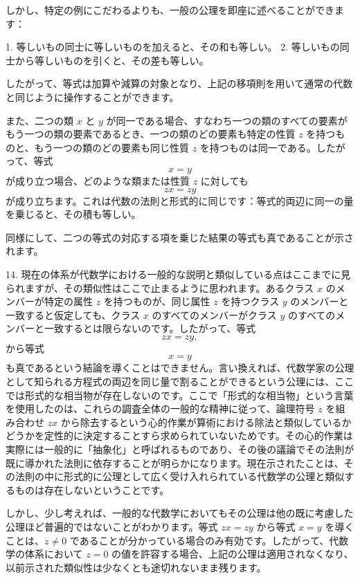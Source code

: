 \documentclass[a4paper,11pt,openany]{ltjsbook}
\begin{document}
しかし、特定の例にこだわるよりも、一般の公理を即座に述べることができます：

1. 等しいもの同士に等しいものを加えると、その和も等しい。
2. 等しいもの同士から等しいものを引くと、その差も等しい。

したがって、等式は加算や減算の対象となり、上記の移項則を用いて通常の代数と同じように操作することができます。

また、二つの類 \(x\) と \(y\) が同一である場合、すなわち一つの類のすべての要素がもう一つの類の要素であるとき、一つの類のどの要素も特定の性質 \(z\) を持つものと、もう一つの類のどの要素も同じ性質 \(z\) を持つものは同一である。したがって、等式
\[
x = y
\]
が成り立つ場合、どのような類または性質 \(z\) に対しても
\[
zx = zy
\]
が成り立ちます。これは代数の法則と形式的に同じです：等式的両辺に同一の量を乗じると、その積も等しい。

同様にして、二つの等式の対応する項を乗じた結果の等式も真であることが示されます。

14. 現在の体系が代数学における一般的な説明と類似している点はここまでに見られますが、その類似性はここで止まるように思われます。あるクラス \( x \) のメンバーが特定の属性 \( z \) を持つものが、同じ属性 \( z \) を持つクラス \( y \) のメンバーと一致すると仮定しても、クラス \( x \) のすべてのメンバーがクラス \( y \) のすべてのメンバーと一致するとは限らないのです。したがって、等式
\[
zx = zy,
\]
から等式
\[
x = y
\]
も真であるという結論を導くことはできません。言い換えれば、代数学家の公理として知られる方程式の両辺を同じ量で割ることができるという公理には、ここでは形式的な相当物が存在しないのです。ここで「形式的な相当物」という言葉を使用したのは、これらの調査全体の一般的な精神に従って、論理符号 \( z \) を組み合わせ \( zx \) から除去するという心的作業が算術における除法と類似しているかどうかを定性的に決定することすら求められていないためです。その心的作業は実際には一般的に「抽象化」と呼ばれるものであり、その後の議論でその法則が既に導かれた法則に依存することが明らかになります。現在示されたことは、その法則の中に形式的に公理として広く受け入れられている代数学の公理と類似するものは存在しないということです。

しかし、少し考えれば、一般的な代数学においてもその公理は他の既に考慮した公理ほど普遍的ではないことがわかります。等式 \( zx = zy \) から等式 \( x = y \) を導くことは、\( z \neq 0 \) であることが分かっている場合のみ有効です。したがって、代数学の体系において \( z = 0 \) の値を許容する場合、上記の公理は適用されなくなり、以前示された類似性は少なくとも途切れないまま残ります。
\end{document}
